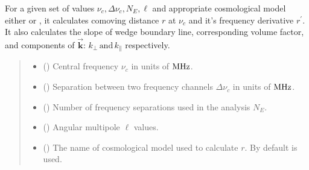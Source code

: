 \documentclass[a4paper,11pt,oneside,english,openany]{sphinxmanual}
\begin{document}
\begin{fulllineitems}
\label{\detokenize{psestimation:psestimation.build_essential}}
\pysigstartsignatures
{}
\pysigstopsignatures
\sphinxAtStartPar
For a given set of values \(\nu_c,\Delta\nu_c,N_E,\ell\) and appropriate cosmological model either  or , it calculates  comoving distance \(r\) at \(\nu_c\) and it’s frequency derivative \(r^\prime\). It also calculates the slope of wedge boundary line, corresponding volume factor, and components of \(\vec{\mathbf{k}}\): \(k_{\perp}\,\text{and}\,k_{\parallel}\) respectively.
\begin{quote}\begin{description}
\begin{itemize}
\item {} 
\sphinxAtStartPar
{} () \textendash{} Central frequency \(\nu_c\) in units of \(\rm MHz\).

\item {} 
\sphinxAtStartPar
{} () \textendash{} Separation between two frequency channels \(\Delta\nu_c\) in units of \(\rm MHz\).

\item {} 
\sphinxAtStartPar
{} () \textendash{} Number of frequency separations used in the analysis \(N_E\).

\item {} 
\sphinxAtStartPar
{} () \textendash{} Angular multipole \(\ell\) values.

\item {} 
\sphinxAtStartPar
{} (\sphinxstyleliteralemphasis{\sphinxupquote{,}}\sphinxstyleliteralemphasis{\sphinxupquote{, }}) \textendash{} The name of cosmological model used to calculate  \(r\). By default  is used.


\end{itemize}
\end{description}
\end{quote}
\end{fulllineitems}
\end{document}
